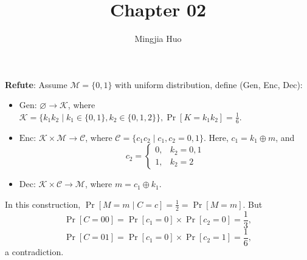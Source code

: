 \documentclass[12pt]{article}
\newcommand{\K}{\mathcal{K}}
\newcommand{\M}{\mathcal{M}}
\newcommand{\C}{\mathcal{C}}
\newcommand{\Enc}{\text{Enc}}
\newcommand{\Dec}{\text{Dec}}
\newcommand{\Gen}{\text{Gen}}
\newenvironment{problem}[2][Problem]{\begin{trivlist}
\item[\hskip \labelsep {\bfseries #1}\hskip \labelsep {\bfseries #2.}]}{\end{trivlist}}
\begin{document}
 
\title{Chapter 02}
\author{Mingjia Huo}
\date{}
\maketitle

\begin{problem}{2.3} 
\textbf{Refute}: 
Assume $\mathcal{M}=\{0,1\}$ with uniform distribution, define (Gen, Enc, Dec):
\begin{itemize}
    \item $\Gen$: $\varnothing\rightarrow\K$, where $\mathcal{K}=\{k_1k_2\mid k_1\in\{0,1\}, k_2\in\{0,1,2\}\}, \Pr[K=k_1k_2]=\frac16$.
    \item $\Enc$: $\K\times\M\rightarrow\C$, where $\mathcal{C}=\{c_1c_2\mid c_1,c_2=0,1\}$. Here, $c_1=k_1\oplus m$, and
    \begin{equation*}
        c_2=\begin{cases}
        0, & k_2=0,1 \\
        1, & k_2=2
        \end{cases}
    \end{equation*}
    \item $\Dec$: $\K\times\C\rightarrow\M$, where $m=c_1\oplus k_1$.
\end{itemize}\par
In this construction, $\Pr[M=m\mid C=c]=\frac 12=\Pr[M=m]$. But $$\Pr[C=00]=\Pr[c_1=0]\times\Pr[c_2=0]=\frac13,$$ $$\Pr[C=01]=\Pr[c_1=0]\times\Pr[c_2=1]=\frac16,$$ a contradiction.
\end{problem}
\end{document}
